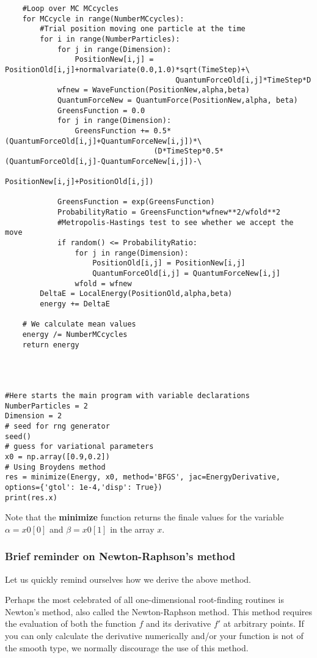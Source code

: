 \documentclass{beamer}
\begin{document}
\begin{frame}
\begin{verbatim}
    #Loop over MC MCcycles
    for MCcycle in range(NumberMCcycles):
        #Trial position moving one particle at the time
        for i in range(NumberParticles):
            for j in range(Dimension):
                PositionNew[i,j] = PositionOld[i,j]+normalvariate(0.0,1.0)*sqrt(TimeStep)+\
                                       QuantumForceOld[i,j]*TimeStep*D
            wfnew = WaveFunction(PositionNew,alpha,beta)
            QuantumForceNew = QuantumForce(PositionNew,alpha, beta)
            GreensFunction = 0.0
            for j in range(Dimension):
                GreensFunction += 0.5*(QuantumForceOld[i,j]+QuantumForceNew[i,j])*\
	                              (D*TimeStep*0.5*(QuantumForceOld[i,j]-QuantumForceNew[i,j])-\
                                      PositionNew[i,j]+PositionOld[i,j])
      
            GreensFunction = exp(GreensFunction)
            ProbabilityRatio = GreensFunction*wfnew**2/wfold**2
            #Metropolis-Hastings test to see whether we accept the move
            if random() <= ProbabilityRatio:
                for j in range(Dimension):
                    PositionOld[i,j] = PositionNew[i,j]
                    QuantumForceOld[i,j] = QuantumForceNew[i,j]
                wfold = wfnew
        DeltaE = LocalEnergy(PositionOld,alpha,beta)
        energy += DeltaE
            
    # We calculate mean values
    energy /= NumberMCcycles
    return energy




#Here starts the main program with variable declarations
NumberParticles = 2
Dimension = 2
# seed for rng generator 
seed()
# guess for variational parameters
x0 = np.array([0.9,0.2])
# Using Broydens method
res = minimize(Energy, x0, method='BFGS', jac=EnergyDerivative, options={'gtol': 1e-4,'disp': True})
print(res.x)

\end{verbatim}

Note that the \textbf{minimize} function returns the finale values for the variable $\alpha=x0[0]$ and $\beta=x0[1]$ in the array $x$.
\end{frame}

\begin{frame}
\frametitle{Brief reminder on Newton-Raphson's method}

Let us quickly remind ourselves how we derive the above method.

Perhaps the most celebrated of all one-dimensional root-finding
routines is Newton's method, also called the Newton-Raphson
method. This method  requires the evaluation of both the
function $f$ and its derivative $f'$ at arbitrary points. 
If you can only calculate the derivative
numerically and/or your function is not of the smooth type, we
normally discourage the use of this method.
\end{frame}
\end{document}
